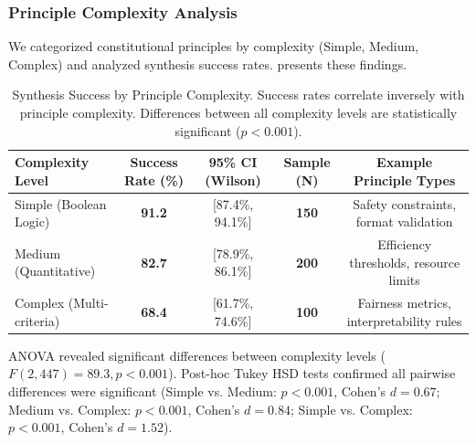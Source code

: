 \documentclass[manuscript,screen,review,anonymous,9pt]{acmart}
\newcommand{\tablesize}{\footnotesize} %
\newcommand{\tablenumfmt}[1]{\textbf{#1}}
\newcommand{\tableheader}[1]{\textbf{#1}}
\begin{document}
\subsubsection{Principle Complexity Analysis}
We categorized constitutional principles by complexity (Simple, Medium, Complex) and analyzed synthesis success rates.  presents these findings.
\begin{table}[htbp]
\centering
\caption{Synthesis Success by Principle Complexity. Success rates correlate inversely with principle complexity. Differences between all complexity levels are statistically significant ($p < 0.001$).}
\label{tab:complexity_analysis}
\tablesize
\begin{tabular}{@{}lcccc@{}}
\toprule
\tableheader{Complexity Level} & \tableheader{Success Rate (\%)} & \tableheader{95\% CI (Wilson)} & \tableheader{Sample (N)} & \tableheader{Example Principle Types} \\
\midrule
Simple (Boolean Logic)    & \tablenumfmt{91.2} & [87.4\%, 94.1\%] & \tablenumfmt{150} & Safety constraints, format validation \\
Medium (Quantitative)   & \tablenumfmt{82.7} & [78.9\%, 86.1\%] & \tablenumfmt{200} & Efficiency thresholds, resource limits \\
Complex (Multi-criteria) & \tablenumfmt{68.4} & [61.7\%, 74.6\%] & \tablenumfmt{100} & Fairness metrics, interpretability rules \\
\bottomrule
\end{tabular}
\end{table}
ANOVA revealed significant differences between complexity levels ($F(2,447) = 89.3, p < 0.001$). Post-hoc Tukey HSD tests confirmed all pairwise differences were significant (Simple vs. Medium: $p < 0.001$, Cohen's $d = 0.67$; Medium vs. Complex: $p < 0.001$, Cohen's $d = 0.84$; Simple vs. Complex: $p < 0.001$, Cohen's $d = 1.52$).
\end{document}
